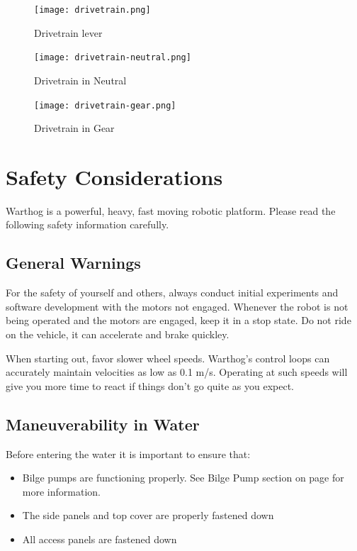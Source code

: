 \documentclass[]{clearpath-latex/clearpath-manual}
\begin{document}
\begin{figure}[!htb]
  \centering
  \texttt{[image: drivetrain.png]}
  \caption{Drivetrain lever}
  \label{lever}
\end{figure}


\begin{figure}[!htb]
  \centering
  \texttt{[image: drivetrain-neutral.png]}
  \caption{Drivetrain in Neutral}
  \label{drivetrain-n}
\end{figure}


\begin{figure}[!t]
  \centering
  \texttt{[image: drivetrain-gear.png]}
  \caption{Drivetrain in Gear}
  \label{drivetrain-g}
\end{figure}


\section{Safety Considerations}

Warthog is a powerful, heavy, fast moving robotic platform. Please read the following safety information carefully.

\subsection{General Warnings}

For the safety of yourself and others, always conduct initial experiments and software development with the motors not engaged.  Whenever the robot is not being operated and the motors are engaged, keep it in a stop state.  Do not ride on the vehicle, it can accelerate and brake quickley.

When starting out, favor slower wheel speeds. Warthog's control loops can accurately maintain velocities as low as 0.1 m/s. Operating at such speeds will give you more time to react if things don’t go quite as you expect.

\subsection{Maneuverability in Water}

Before entering the water it is important to ensure that:

\begin{itemize}[nolistsep]
  \item Bilge pumps are functioning properly.  See Bilge Pump section on page \pageref{bilgepumps} for more information.
  \item The side panels and top cover are properly fastened down
  \item All access panels are fastened down
\end{itemize}
\end{document}
